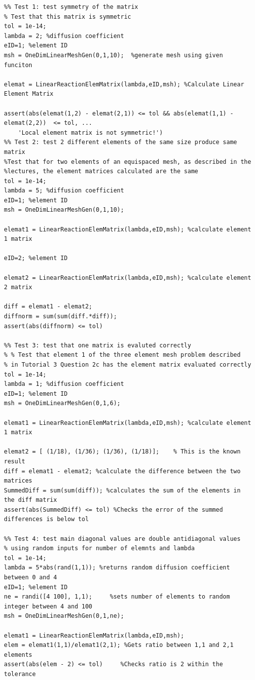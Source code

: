 \documentclass[11pt]{article}
\begin{document}
\begin{appendices}
\begin{lstlisting}
%% Test 1: test symmetry of the matrix
% Test that this matrix is symmetric
tol = 1e-14;
lambda = 2; %diffusion coefficient
eID=1; %element ID
msh = OneDimLinearMeshGen(0,1,10);  %generate mesh using given funciton

elemat = LinearReactionElemMatrix(lambda,eID,msh); %Calculate Linear Element Matrix

assert(abs(elemat(1,2) - elemat(2,1)) <= tol && abs(elemat(1,1) - elemat(2,2))  <= tol, ...
    'Local element matrix is not symmetric!')
%% Test 2: test 2 different elements of the same size produce same matrix
%Test that for two elements of an equispaced mesh, as described in the
%lectures, the element matrices calculated are the same
tol = 1e-14;
lambda = 5; %diffusion coefficient
eID=1; %element ID
msh = OneDimLinearMeshGen(0,1,10);

elemat1 = LinearReactionElemMatrix(lambda,eID,msh);	%calculate element 1 matrix

eID=2; %element ID

elemat2 = LinearReactionElemMatrix(lambda,eID,msh); %calculate element 2 matrix

diff = elemat1 - elemat2;
diffnorm = sum(sum(diff.*diff));
assert(abs(diffnorm) <= tol)

%% Test 3: test that one matrix is evaluted correctly
% % Test that element 1 of the three element mesh problem described 
% in Tutorial 3 Question 2c has the element matrix evaluated correctly
tol = 1e-14;
lambda = 1; %diffusion coefficient
eID=1; %element ID
msh = OneDimLinearMeshGen(0,1,6);

elemat1 = LinearReactionElemMatrix(lambda,eID,msh); %calculate element 1 matrix

elemat2 = [ (1/18), (1/36); (1/36), (1/18)];    % This is the known result
diff = elemat1 - elemat2; %calculate the difference between the two matrices
SummedDiff = sum(sum(diff)); %calculates the sum of the elements in the diff matrix
assert(abs(SummedDiff) <= tol) %Checks the error of the summed differences is below tol

%% Test 4: test main diagonal values are double antidiagonal values
% using random inputs for number of elemnts and lambda
tol = 1e-14;
lambda = 5*abs(rand(1,1)); %returns random diffusion coefficient between 0 and 4
eID=1; %element ID
ne = randi([4 100], 1,1);     %sets number of elements to random integer between 4 and 100
msh = OneDimLinearMeshGen(0,1,ne);

elemat1 = LinearReactionElemMatrix(lambda,eID,msh);
elem = elemat1(1,1)/elemat1(2,1); %Gets ratio between 1,1 and 2,1 elements
assert(abs(elem - 2) <= tol)     %Checks ratio is 2 within the tolerance


\end{lstlisting}
\end{appendices}
\end{document}
